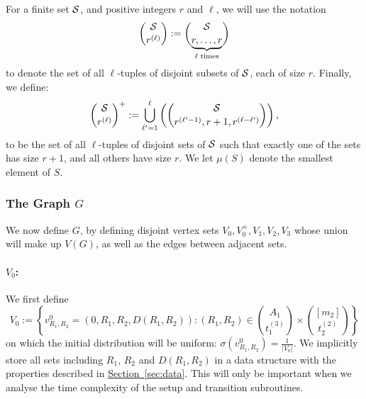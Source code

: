 \documentclass{article}
\renewcommand{\sec}[1]{\hyperref[sec:#1]{Section~\ref*{sec:#1}}}
\renewcommand{\>}{\rangle}
\newcommand{\<}{\langle}
\renewcommand{\(}{\left(}
\renewcommand{\)}{\right)}
\begin{document}
For a finite set ${\cal S}$, and positive integers $r$ and $\ell$, we will use the notation 
\begin{equation}
\binom{{\cal S}}{r^{(\ell)}}:=\binom{{\cal S}}{\underbrace{r,\dots,r}_{\ell\;\mathrm{times}}}\label{eq:weird-binom}
\end{equation}
to denote the set of all $\ell$-tuples of disjoint subsets of ${\cal S}$, each of size $r$. 
Finally, we define:
\begin{equation}
{\binom{\cal S}{r^{(\ell)}}^+} := \bigcup_{\ell'=1}^{\ell} \left(\binom{\cal S}{r^{(\ell'-1)},r+1,r^{(\ell-\ell')}}\right),\label{eq:weird-binom+}
\end{equation}
to be the set of all $\ell$-tuples of disjoint sets of ${\cal S}$ such that exactly one of the sets has size $r+1$, and all others have size $r$. We let $\mu(S)$ denote the smallest element of $S$.

\subsubsection{The Graph \texorpdfstring{$G$}{G}}\label{sec:3-dist-G}

We now define $G$, by defining disjoint vertex sets $V_0,V_0^+,V_1,V_2,V_3$ whose union will make up $V(G)$, as well as the edges between adjacent sets. 

\paragraph{$V_0$:} We first define 
\begin{equation}
V_0:=\left\{v^0_{R_1,R_2}=(0,R_1,R_2,D(R_1,R_2)):(R_1,R_2)\in\binom{A_1}{t_1^{(3)}}\times\binom{[m_2]}{t_2^{(2)}}\right\}\label{eq:3-dist-V1}
\end{equation}
on which the initial distribution will be uniform: $\sigma(v^0_{R_1,R_2})=\frac{1}{|V_0|}$. We implicitly store all sets including $R_1$, $R_2$ and $D(R_1,R_2)$ in a data structure with the properties described in \sec{data}. This will only be important when we analyse the time complexity of the setup and transition subroutines. 
\end{document}
